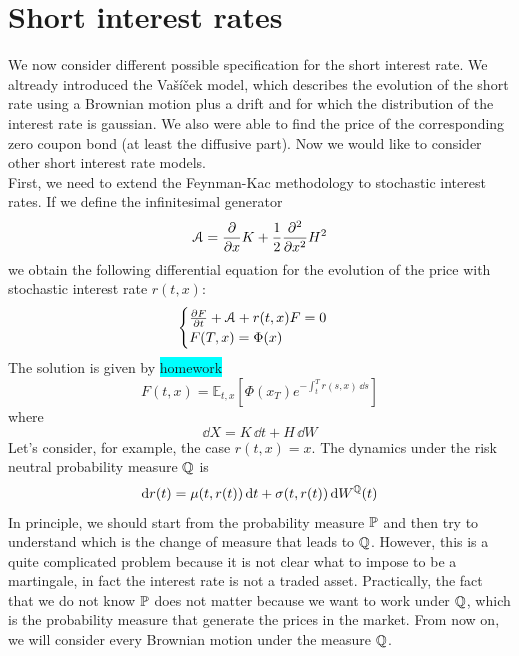 \section{Short interest rates} %
We now consider different possible specification for the short interest rate. We altready introduced the Vašíček model, which describes the evolution of the short rate using a Brownian motion plus a drift and for which the distribution of the interest rate is gaussian. We also were able to find the price of the corresponding zero coupon bond (at least the diffusive part). Now we would like to consider other short interest rate models. \\
First, we need to extend the Feynman-Kac methodology to stochastic interest rates. If we define the infinitesimal generator
\begin{equation*}
    \mathcal{A} = \pdv{}{x}K + \frac{1}{2}\pdv[2]{}{x}H^2
\end{equation*}
we obtain the following differential equation for the evolution of the price with stochastic interest rate $r(t,x)$:
\begin{equation}
    \begin{cases}
        \pdv{F}{t} + \mathcal{A} + r(t,x)F = 0 \\
        F(T,x) = \Phi(x)
    \end{cases}
\end{equation}
The solution is given by \colorbox{cyan}{homework}
\begin{equation}
    F(t,x) = \mathbb{E}_{t,x}\left[\Phi(x_T)e^{-\int_t^T r(s,x)\,\dd s}\right]
\end{equation}
where
\begin{equation}
    \dd X = K\,\dd t + H\,\dd W
\end{equation}
Let's consider, for example, the case $r(t,x) = x$. The dynamics under the risk neutral probability measure $\mathbb{Q}$ is
\begin{equation}
    \dd r(t) = \mu(t,r(t))\,\dd t + \sigma(t,r(t))\,\dd W^{\mathbb{Q}}(t)
\end{equation}
In principle, we should start from the probability measure $\mathbb{P}$ and then try to understand which is the change of measure that leads to $\mathbb{Q}$. However, this is a quite complicated problem because it is not clear what to impose to be a martingale, in fact the interest rate is not a traded asset. Practically, the fact that we do not know $\mathbb{P}$ does not matter because we want to work under $\mathbb{Q}$, which is the probability measure that generate the prices in the market. From now on, we will consider every Brownian motion under the measure $\mathbb{Q}$.

